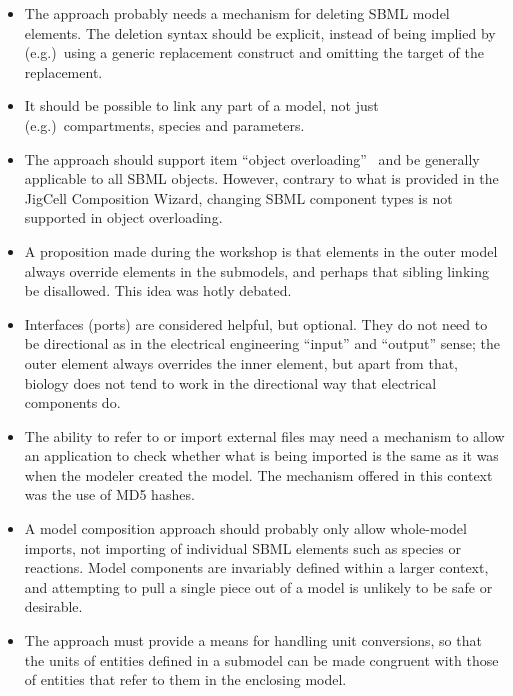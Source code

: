 \begin{enumerate}
\begin{itemize}
  \item The approach probably needs a mechanism for deleting SBML model elements.  The deletion syntax should be explicit, instead of being implied by (e.g.)\ using a generic replacement construct and omitting the target of the replacement.

  \item It should be possible to link any part of a model, not just (e.g.)\ compartments, species and parameters.

  \item The approach should support item ``object overloading''~\citep{various:2007b} and be generally applicable to all SBML objects.  However, contrary to what is provided in the JigCell Composition Wizard, changing SBML component types is not supported in object overloading.

  \item A proposition made during the workshop is that elements in the outer model always override elements in the submodels, and perhaps that sibling linking be disallowed.  This idea was hotly debated.

  \item Interfaces (ports) are considered helpful, but optional.  They do not need to be directional as in the electrical engineering ``input'' and ``output'' sense; the outer element always overrides the inner element, but apart from that, biology does not tend to work in the directional way that electrical components do.

  \item The ability to refer to or import external files may need a mechanism to allow an application to check whether what is being imported is the same as it was when the modeler created the model.  The mechanism offered in this context was the use of MD5 hashes.

  \item A model composition approach should probably only allow whole-model imports, not importing of individual SBML elements such as species or reactions.  Model components are invariably defined within a larger context, and attempting to pull a single piece out of a model is unlikely to be safe or desirable.

  \item The approach must provide a means for handling unit conversions, so that the units of entities defined in a submodel can be made congruent with those of entities that refer to them in the enclosing model.

  \end{itemize}

\end{enumerate}

